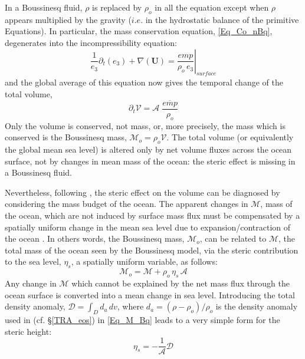 \documentclass[NEMO_book]{subfiles}
\begin{document}
In a Boussinesq fluid, $\rho$ is replaced by $\rho_o$ in all the equation except when $\rho$ 
appears multiplied by the gravity ($i.e.$ in the hydrostatic balance of the primitive Equations). 
In particular, the mass conservation equation, \eqref{Eq_Co_nBq}, degenerates into 
the incompressibility equation:
\begin{equation}  \label{Eq_Co_Bq}
\frac{1}{e_3} \partial_t ( e_3 ) + \nabla( \textbf{U} ) =  \left. \frac{\textit{emp}}{\rho_o \,e_3}\right|_ \textit{surface}
\end{equation}
and the global average of this equation now gives the temporal change of the total volume,
\begin{equation}  \label{Eq_V_Bq}
  \partial_t \mathcal{V} =   \mathcal{A} \;\frac{\overline{\textit{emp}}}{\rho_o} 
\end{equation}
Only the volume is conserved, not mass, or, more precisely, the mass which is conserved is the 
Boussinesq mass, $\mathcal{M}_o = \rho_o \mathcal{V}$. The total volume (or equivalently  
the global mean sea level) is altered only by net volume fluxes across the ocean surface,  
not by changes in mean mass of the ocean: the steric effect is missing in a Boussinesq fluid.
 
Nevertheless, following \citep{Greatbatch_JGR94}, the steric effect on the volume can be 
diagnosed by considering the mass budget of the ocean. 
The apparent changes in $\mathcal{M}$, mass of the ocean, which are not induced by surface 
mass flux must be compensated by a spatially uniform change in the mean sea level due to 
expansion/contraction of the ocean \citep{Greatbatch_JGR94}. In others words, the Boussinesq 
mass, $\mathcal{M}_o$, can be related to $\mathcal{M}$, the  total mass of the ocean seen 
by the Boussinesq model, via the steric contribution to the sea level, $\eta_s$, a spatially 
uniform variable, as follows:
\begin{equation}  \label{Eq_M_Bq}
   \mathcal{M}_o  =  \mathcal{M} + \rho_o \,\eta_s \,\mathcal{A} 
\end{equation}
Any change in $\mathcal{M}$ which cannot be explained by the net mass flux through 
the ocean surface is converted into a mean change in sea level. Introducing the total density 
anomaly, $\mathcal{D}= \int_D d_a \,dv$, where $d_a= (\rho -\rho_o ) / \rho_o$  
is the density anomaly used in \NEMO (cf. \S\ref{TRA_eos}) in \eqref{Eq_M_Bq}
leads to a very simple form for the steric height:
\begin{equation}  \label{Eq_steric_Bq}
   \eta_s = - \frac{1}{\mathcal{A}} \mathcal{D} 
\end{equation}
\end{document}
